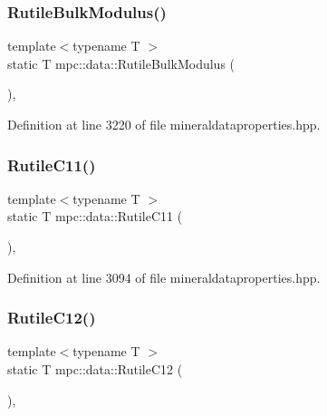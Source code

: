 \subsubsection{\texorpdfstring{Rutile\+Bulk\+Modulus()}{RutileBulkModulus()}}
{\footnotesize\ttfamily template$<$typename T $>$ \\
static T mpc\+::data\+::\+Rutile\+Bulk\+Modulus (\begin{DoxyParamCaption}{ }\end{DoxyParamCaption})\hspace{0.3cm}{\ttfamily [inline]}, {\ttfamily [static]}}



Definition at line 3220 of file mineraldataproperties.\+hpp.

\mbox{\label{namespacempc_1_1data_afd6f2a6dfb90f0896ed3617974851c94}} 
\subsubsection{\texorpdfstring{Rutile\+C11()}{RutileC11()}}
{\footnotesize\ttfamily template$<$typename T $>$ \\
static T mpc\+::data\+::\+Rutile\+C11 (\begin{DoxyParamCaption}{ }\end{DoxyParamCaption})\hspace{0.3cm}{\ttfamily [inline]}, {\ttfamily [static]}}



Definition at line 3094 of file mineraldataproperties.\+hpp.

\mbox{\label{namespacempc_1_1data_ad1d4e3e3a9d1d390a470fd61d871a4da}} 
\subsubsection{\texorpdfstring{Rutile\+C12()}{RutileC12()}}
{\footnotesize\ttfamily template$<$typename T $>$ \\
static T mpc\+::data\+::\+Rutile\+C12 (\begin{DoxyParamCaption}{ }\end{DoxyParamCaption})\hspace{0.3cm}{\ttfamily [inline]}, {\ttfamily [static]}}



